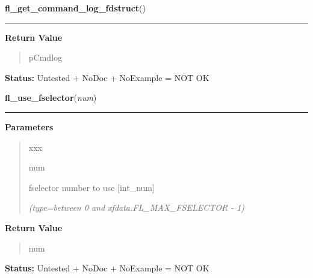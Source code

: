 \hspace{.8\funcindent}\begin{boxedminipage}{\funcwidth}

    \raggedright \textbf{fl\_get\_command\_log\_fdstruct}()

    \vspace{-1.5ex}

    \rule{\textwidth}{0.5\fboxrule}
\setlength{\parskip}{2ex}
\setlength{\parskip}{1ex}
      \textbf{Return Value}
    \vspace{-1ex}

      \begin{quote}
      pCmdlog

      \end{quote}

\textbf{Status:} Untested + NoDoc + NoExample = NOT OK



    \end{boxedminipage}

    \label{xformslib:library:fl_use_fselector}

    \vspace{0.5ex}

\hspace{.8\funcindent}\begin{boxedminipage}{\funcwidth}

    \raggedright \textbf{fl\_use\_fselector}(\textit{num})

    \vspace{-1.5ex}

    \rule{\textwidth}{0.5\fboxrule}
\setlength{\parskip}{2ex}
\setlength{\parskip}{1ex}
      \textbf{Parameters}
      \vspace{-1ex}

      \begin{quote}
        \begin{Ventry}{xxx}

          \item[num]

          fselector number to use [int\_num]

            {\it (type=between 0 and xfdata.FL\_MAX\_FSELECTOR - 1)}

        \end{Ventry}

      \end{quote}

      \textbf{Return Value}
    \vspace{-1ex}

      \begin{quote}
      num

      \end{quote}

\textbf{Status:} Untested + NoDoc + NoExample = NOT OK



    \end{boxedminipage}

